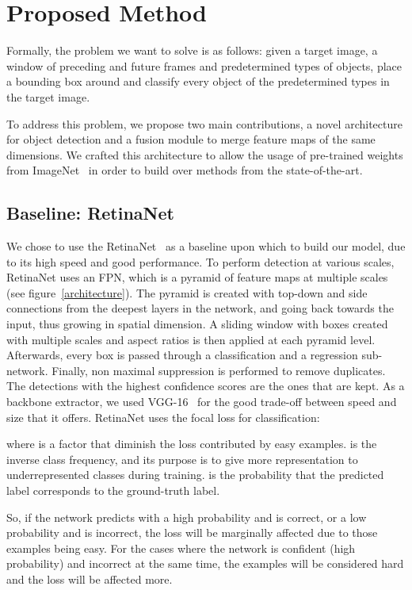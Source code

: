 \documentclass[runningheads]{llncs}
\begin{document}
\section{Proposed Method}
Formally, the problem we want to solve is as follows: given a target image, a window of  preceding and  future frames and predetermined types of objects, place a bounding box around and classify every object of the predetermined types in the target image.   

To address this problem, we propose two main contributions, a novel architecture for object detection and a fusion module to merge feature maps of the same dimensions. We crafted this architecture to allow the usage of pre-trained weights from ImageNet~\cite{imagenet_cvpr09} in order to build over methods from the state-of-the-art. 

\subsection{Baseline: RetinaNet}
We chose to use the RetinaNet~\cite{lin2018focal} as a baseline upon which to build our model, due to its high speed and good performance. To perform detection at various scales, RetinaNet uses an FPN, which is a pyramid of feature maps at multiple scales (see figure~\ref{architecture}). The pyramid is created with top-down and side connections from the deepest layers in the network, and going back towards the input, thus growing in spatial dimension. A sliding window with boxes created with multiple scales and aspect ratios is then applied at each pyramid level. Afterwards, every box is passed through a classification and a regression sub-network. Finally, non maximal suppression is performed to remove duplicates. The detections with the highest confidence scores are the ones that are kept. As a backbone extractor, we used VGG-16~\cite{VGG_Simonyan2014} for the good trade-off between speed and size that it offers. RetinaNet uses the focal loss for classification:


where  is a factor that diminish the loss contributed by easy examples.  is the inverse class frequency, and its purpose is to give more representation to underrepresented classes during training.  is the probability that the predicted label corresponds to the ground-truth label. 

So, if the network predicts with a high probability and is correct, or a low probability and is incorrect, the loss will be marginally affected due to those examples being easy. For the cases where the network is confident (high probability) and incorrect at the same time, the examples will be considered hard and the loss will be affected more.
\end{document}
